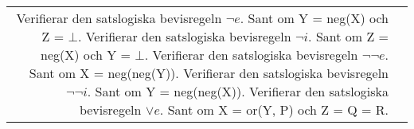 \documentclass[a4paper,10.5pt]{article}
\newcommand{\predrow}[3]{
    \pbox[t]{20cm}{\texttt{#1}} & \pbox[t]{20cm}{\texttt{#2}\\ \raisebox{-0.1cm}{\pbox[t]{20cm}{#3}} \vspace{0.33cm}}\\ 
}
\begin{document}
\begin{tabular}{r l}
\predrow{negel/3}{negel(?X, ?Y, ?Z)}{Verifierar den satslogiska bevisregeln $\lnot e$.\\ Sant om Y = neg(X) och Z = $\bot$.}
\predrow{negint/3}{negint(?X, ?Y, ?Z)}{Verifierar den satslogiska bevisregeln $\lnot i$.\\ Sant om Z = neg(X) och Y = $\bot$.}
\predrow{negnegel/2}{negnegel(?X, ?Y)}{Verifierar den satslogiska bevisregeln $\lnot \lnot e$.\\ Sant om X = neg(neg(Y)).}
\predrow{negnegint/2}{negnegint(?X, ?Y)}{Verifierar den satslogiska bevisregeln $\lnot \lnot i$.\\ Sant om Y = neg(neg(X)).}
\predrow{orel/6}{orel(?X, ?Y, ?Z, ?P, ?Q, ?R)}{Verifierar den satslogiska bevisregeln $\lor e$.\\ Sant om X = or(Y, P) och Z = Q = R.}
\end{tabular}
\newpage
\end{document}

